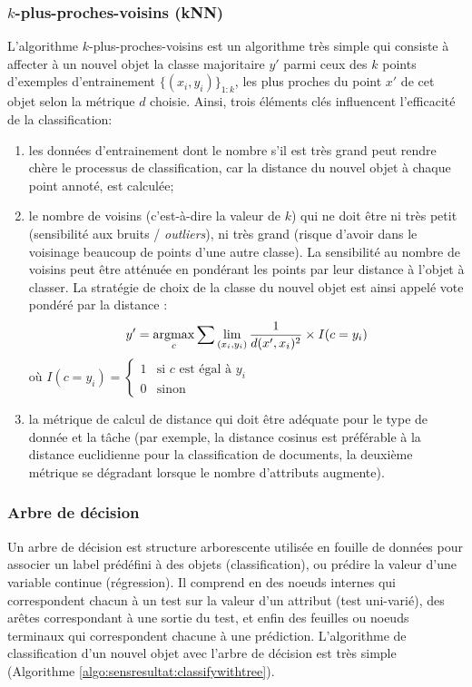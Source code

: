 \subsubsection{$k$-plus-proches-voisins (kNN)}
L'algorithme $k$-plus-proches-voisins est un algorithme très simple qui consiste à affecter à un nouvel objet la classe majoritaire $y'$ parmi ceux des $k$ points d'exemples d'entrainement $\lbrace (x_i,y_i) \rbrace_{1:k}$, les plus proches du point $x'$ de cet objet selon la métrique $d$ choisie. Ainsi, trois éléments clés influencent l'efficacité de la classification:
\begin{enumerate}
	\item les données d'entrainement dont le nombre s'il est très grand peut rendre chère le processus de classification, car la distance du nouvel objet à chaque point annoté, est calculée;
	\item le nombre de voisins (c'est-à-dire la valeur de $k$) qui ne doit être ni très petit (sensibilité aux bruits / \textit{outliers}), ni très grand (risque d'avoir dans le voisinage beaucoup de points d'une autre classe). La sensibilité au nombre de voisins peut être atténuée en pondérant les points par leur distance à l'objet à classer. La stratégie de choix de la classe du nouvel objet est ainsi appelé \og vote pondéré par la distance \fg{}: \[y' = \mathop{\mathrm{argmax}}\limits\limits_c \sum\lim\limits_{(x_i,y_i)} \frac{1}{d(x', x_i)^2} \times I(c = y_i)\] où $I(c=y_i) = \left\lbrace \begin{array}{ll}
	1 & \text{si }c \text{ est égal à } y_i \\
	0 & \text{sinon}
	\end{array} \right.$
	\item la métrique de calcul de distance qui doit être adéquate pour le type de donnée et la tâche (par exemple, la distance cosinus est préférable à la distance euclidienne pour la classification de documents, la deuxième métrique se dégradant lorsque le nombre d'attributs augmente).
\end{enumerate}


\subsubsection{Arbre de décision}
Un arbre de décision est structure arborescente utilisée en fouille de données pour associer un label prédéfini à des objets (classification), ou prédire la valeur d'une variable continue (régression). Il comprend en des noeuds internes qui correspondent chacun à un test sur la valeur d'un attribut (test uni-varié), des arêtes correspondant à une sortie du test, et enfin des feuilles ou noeuds terminaux qui correspondent chacune à une prédiction. L'algorithme de classification d'un nouvel objet avec l'arbre de décision est très simple (Algorithme \ref{algo:sensresultat:classifywithtree}).

